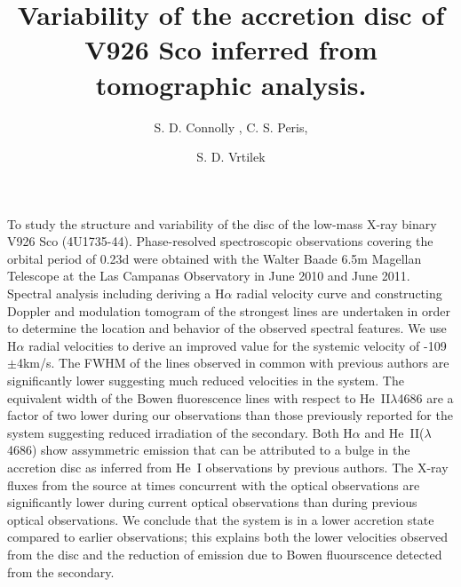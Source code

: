 \documentclass{aa}
\begin{document}
 


   \title{Variability of the accretion disc of V926 Sco inferred
from tomographic analysis.}

   \author{S. D. Connolly
          , 
	   C. S. Peris, 
          \and
          S. D. Vrtilek
          }


   \date{}

 
  \abstract
	{}
{To study the structure and variability of the disc of the low-mass X-ray binary V926 Sco 
(4U1735-44).}
{Phase-resolved spectroscopic observations 
covering the orbital period of 0.23d were obtained with the Walter Baade 6.5m Magellan Telescope at the Las Campanas Observatory in June 2010 and June 2011. 
Spectral analysis including deriving a H$\alpha$ radial velocity curve and 
constructing 
Doppler and modulation tomogram of the strongest lines are undertaken in 
order to determine  
the location and behavior of the observed spectral features.
}
  {We use H$\alpha$ radial velocities to
derive an improved value for the systemic velocity of -109$\pm$4km/s.
The FWHM of the lines observed in common with previous authors
are significantly lower suggesting much reduced velocities in the
system. The equivalent width of the Bowen fluorescence
lines with respect to He~II$\lambda$4686 are a factor of two lower
during our observations than those previously reported for the system
suggesting reduced irradiation of the secondary.
Both H$\alpha$ and He~II($\lambda$4686) show assymmetric emission that can
be attributed to a bulge in the accretion disc as inferred from He~I observations
by previous authors.  
The X-ray fluxes from the source at times concurrent with
the optical observations are  
significantly lower during current optical observations than during 
previous optical observations. } 
   { We conclude that the system is in a lower accretion state compared to
earlier observations; this explains both the lower velocities observed
from the disc and 
the reduction  
of emission due to Bowen fluourscence detected from the  
secondary.} 
\end{document}
